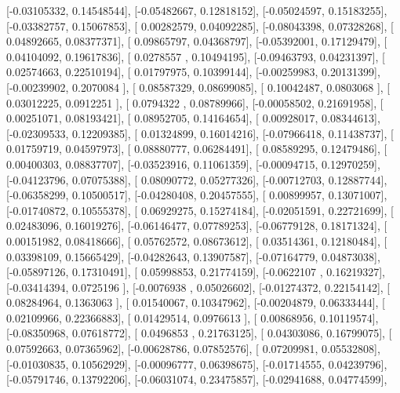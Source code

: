 \documentclass{article}
\begin{document}
       [-0.03105332,  0.14548544],
       [-0.05482667,  0.12818152],
       [-0.05024597,  0.15183255],
       [-0.03382757,  0.15067853],
       [ 0.00282579,  0.04092285],
       [-0.08043398,  0.07328268],
       [ 0.04892665,  0.08377371],
       [ 0.09865797,  0.04368797],
       [-0.05392001,  0.17129479],
       [ 0.04104092,  0.19617836],
       [ 0.0278557 ,  0.10494195],
       [-0.09463793,  0.04231397],
       [ 0.02574663,  0.22510194],
       [ 0.01797975,  0.10399144],
       [-0.00259983,  0.20131399],
       [-0.00239902,  0.2070084 ],
       [ 0.08587329,  0.08699085],
       [ 0.10042487,  0.0803068 ],
       [ 0.03012225,  0.0912251 ],
       [ 0.0794322 ,  0.08789966],
       [-0.00058502,  0.21691958],
       [ 0.00251071,  0.08193421],
       [ 0.08952705,  0.14164654],
       [ 0.00928017,  0.08344613],
       [-0.02309533,  0.12209385],
       [ 0.01324899,  0.16014216],
       [-0.07966418,  0.11438737],
       [ 0.01759719,  0.04597973],
       [ 0.08880777,  0.06284491],
       [ 0.08589295,  0.12479486],
       [ 0.00400303,  0.08837707],
       [-0.03523916,  0.11061359],
       [-0.00094715,  0.12970259],
       [-0.04123796,  0.07075388],
       [ 0.08090772,  0.05277326],
       [-0.00712703,  0.12887744],
       [-0.06358299,  0.10500517],
       [-0.04280408,  0.20457555],
       [ 0.00899957,  0.13071007],
       [-0.01740872,  0.10555378],
       [ 0.06929275,  0.15274184],
       [-0.02051591,  0.22721699],
       [ 0.02483096,  0.16019276],
       [-0.06146477,  0.07789253],
       [-0.06779128,  0.18171324],
       [ 0.00151982,  0.08418666],
       [ 0.05762572,  0.08673612],
       [ 0.03514361,  0.12180484],
       [ 0.03398109,  0.15665429],
       [-0.04282643,  0.13907587],
       [-0.07164779,  0.04873038],
       [-0.05897126,  0.17310491],
       [ 0.05998853,  0.21774159],
       [-0.0622107 ,  0.16219327],
       [-0.03414394,  0.0725196 ],
       [-0.0076938 ,  0.05026602],
       [-0.01274372,  0.22154142],
       [ 0.08284964,  0.1363063 ],
       [ 0.01540067,  0.10347962],
       [-0.00204879,  0.06333444],
       [ 0.02109966,  0.22366883],
       [ 0.01429514,  0.0976613 ],
       [ 0.00868956,  0.10119574],
       [-0.08350968,  0.07618772],
       [ 0.0496853 ,  0.21763125],
       [ 0.04303086,  0.16799075],
       [ 0.07592663,  0.07365962],
       [-0.00628786,  0.07852576],
       [ 0.07209981,  0.05532808],
       [-0.01030835,  0.10562929],
       [-0.00096777,  0.06398675],
       [-0.01714555,  0.04239796],
       [-0.05791746,  0.13792206],
       [-0.06031074,  0.23475857],
       [-0.02941688,  0.04774599],
\end{document}
